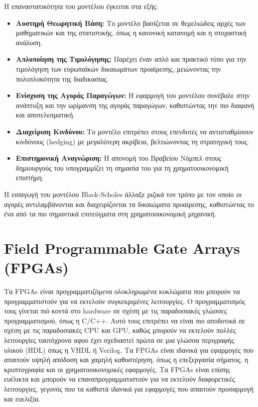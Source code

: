 Η επαναστατικότητα του μοντέλου έγκειται στα εξής:
\begin{itemize}
    \item \textbf{Αυστηρή Θεωρητική Βάση:} Το μοντέλο βασίζεται σε θεμελιώδεις αρχές των μαθηματικών και της στατιστικής, όπως η κανονική κατανομή και η στοχαστική ανάλυση.
    \item \textbf{Απλοποίηση της Τιμολόγησης:} Παρέχει έναν απλό και πρακτικό τύπο για την τιμολόγηση των ευρωπαϊκών δικαιωμάτων προαίρεσης, μειώνοντας την πολυπλοκότητα της διαδικασίας.
    \item \textbf{Ενίσχυση της Αγοράς Παραγώγων:} Η εφαρμογή του μοντέλου συνέβαλε στην ανάπτυξη και την ωρίμανση της αγοράς παραγώγων, καθιστώντας την πιο διαφανή και αποτελεσματική.
    \item \textbf{Διαχείριση Κινδύνου:} Το μοντέλο επιτρέπει στους επενδυτές να αντισταθμίσουν κινδύνους (hedging) με μεγαλύτερη ακρίβεια, βελτιώνοντας τη στρατηγική τους.
    \item \textbf{Επιστημονική Αναγνώριση:} Η απονομή του Βραβείου Νόμπελ στους δημιουργούς του υπογραμμίζει τη σημασία του για τη χρηματοοικονομική επιστήμη.
\end{itemize}

Η εισαγωγή του μοντέλου Black-Scholes άλλαξε ριζικά τον τρόπο με τον οποίο οι αγορές αντιλαμβάνονται και διαχειρίζονται τα δικαιώματα προαίρεσης, καθιστώντας το ένα από τα πιο σημαντικά επιτεύγματα στη χρηματοοικονομική μηχανική.

\section{Field Programmable Gate Arrays (FPGAs)}
\label{sec:fpgas}

Τα FPGAs είναι προγραμματιζόμενα ολοκληρωμένα κυκλώματα που μπορούν να προγραμματιστούν για να εκτελούν συγκεκριμένες λειτουργίες.
Ο προγραμματισμός τους γίνεται πιό κοντά στο hardware σε σχέση με τις παραδοσιακές γλώσσες προγραμματισμού, όπως η C/C++.
Αυτό τους επιτρέπει να είναι πιο αποδοτικά σε σχέση με τις παραδοσιακές CPU και GPU, καθώς μπορούν να εκτελούν πολλές λειτουργίες ταυτόχρονα αφου έχει σχεδιαστεί πρώτα
σε μια γλώσσα περιγραφής υλικού (HDL) όπως η VHDL ή Verilog.
Τα FPGAs είναι ιδανικά για εφαρμογές που απαιτούν υψηλή απόδοση και χαμηλή καθυστέρηση, όπως η επεξεργασία σήματος, η κρυπτογραφία και οι χρηματοοικονομικές εφαρμογές.
Τα FPGAs είναι επίσης ευέλικτα και μπορούν να επαναπρογραμματιστούν για να εκτελούν διαφορετικές λειτουργίες, γεγονός που τα καθιστά ιδανικά για εφαρμογές που απαιτούν προσαρμογή και ευελιξία.

